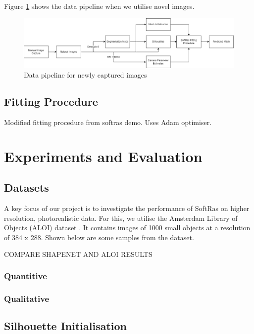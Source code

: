 \documentclass{article}
\begin{document}
Figure \ref {natdatapipe} shows the data pipeline when we utilise novel images.

\begin{figure}[h!]
  \centering
  \includegraphics[width=\textwidth]{images/natdatapipeline.png}
  \caption{Data pipeline for newly captured images}
  \label{natdatapipe}
\end{figure}

\subsection{Fitting Procedure}

Modified fitting procedure from softras demo. Uses Adam optimiser.

\newpage
\section{Experiments and Evaluation}
\subsection{Datasets}

A key focus of our project is to investigate the performance of SoftRas on higher resolution, photorealistic data. For this, we utilise the Amsterdam Library of Objects (ALOI) dataset \parencite{aloi}. It contains images of 1000 small objects at a resolution of 384 x 288. Shown below are some samples from the dataset.

COMPARE SHAPENET AND ALOI RESULTS

\subsubsection{Quantitive}
\subsubsection{Qualitative}

\subsection{Silhouette Initialisation}
\end{document}
